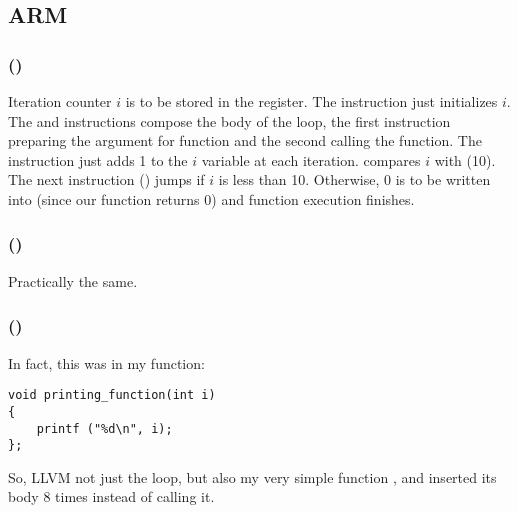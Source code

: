 \subsection{ARM}

\subsubsection{\NonOptimizingKeilVI (\ARMMode)}



Iteration counter $i$ is to be stored in the  register.
The  instruction just initializes $i$.
The  and  instructions
compose the body of the loop, the first instruction preparing the argument for 
\ttf function and the second calling the function.
The  instruction just adds 1 to the $i$ variable at each iteration.
 compares $i$ with  (10). 
The next instruction  () jumps if $i$ is less than 10.
Otherwise, 0 is to be written into  (since our function returns 0)
and function execution finishes.

\subsubsection{\OptimizingKeilVI (\ThumbMode)}



Practically the same.

\subsubsection{\OptimizingXcodeIV (\ThumbTwoMode)}
\label{ARM_unrolled_loops}



In fact, this was in my \ttf function:

\begin{lstlisting}
void printing_function(int i)
{
    printf ("%d\n", i);
};
\end{lstlisting}

So, LLVM not just  the loop, 
but also  my 
very simple function \ttf,
and inserted its body 8 times instead of calling it. 

